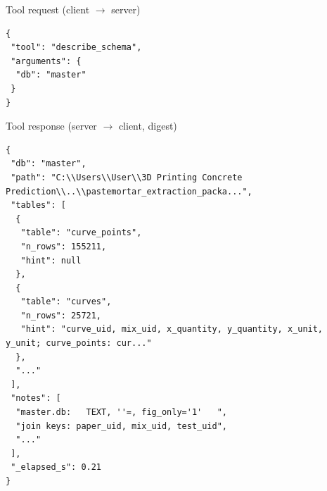\begin{mcpbox}{Tool request (client $\rightarrow$ server)}
\begin{lstlisting}[style=jsonstyle]
{
 "tool": "describe_schema",
 "arguments": {
  "db": "master"
 }
}
\end{lstlisting}
\end{mcpbox}
\begin{mcpbox}{Tool response (server $\rightarrow$ client, digest)}
\begin{lstlisting}[style=jsonstyle]
{
 "db": "master",
 "path": "C:\\Users\\User\\3D Printing Concrete Prediction\\..\\pastemortar_extraction_packa...",
 "tables": [
  {
   "table": "curve_points",
   "n_rows": 155211,
   "hint": null
  },
  {
   "table": "curves",
   "n_rows": 25721,
   "hint": "curve_uid, mix_uid, x_quantity, y_quantity, x_unit, y_unit; curve_points: cur..."
  },
  "..."
 ],
 "notes": [
  "master.db:   TEXT, ''=, fig_only='1'   ",
  "join keys: paper_uid, mix_uid, test_uid",
  "..."
 ],
 "_elapsed_s": 0.21
}
\end{lstlisting}
\end{mcpbox}